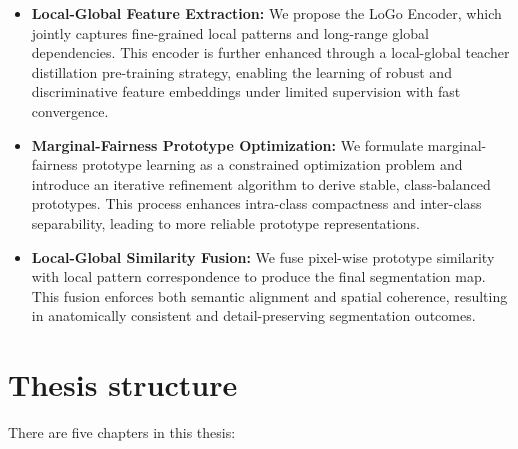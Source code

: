 \begin{itemize}
    \item \textbf{Local-Global Feature Extraction:} We propose the LoGo Encoder, which jointly captures fine-grained local patterns and long-range global dependencies. This encoder is further enhanced through a local-global teacher distillation pre-training strategy, enabling the learning of robust and discriminative feature embeddings under limited supervision with fast convergence.

    \item \textbf{Marginal-Fairness Prototype Optimization:} We formulate marginal-fairness prototype learning as a constrained optimization problem and introduce an iterative refinement algorithm to derive stable, class-balanced prototypes. This process enhances intra-class compactness and inter-class separability, leading to more reliable prototype representations.

    \item \textbf{Local-Global Similarity Fusion:} We fuse pixel-wise prototype similarity with local pattern correspondence to produce the final segmentation map. This fusion enforces both semantic alignment and spatial coherence, resulting in anatomically consistent and detail-preserving segmentation outcomes.
\end{itemize}

\newpage

\section{Thesis structure}
\label{sec:intro-thesis}

There are five chapters in this thesis:

